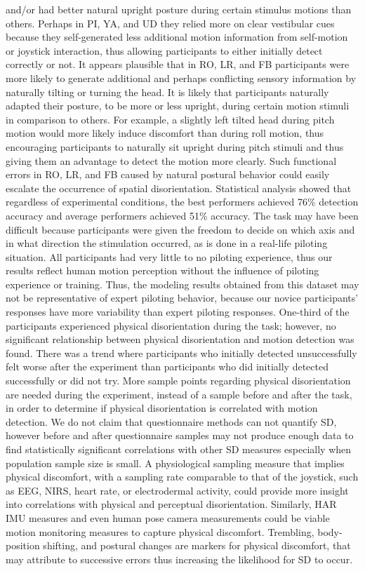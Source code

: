 \documentclass{ieeeaccess}
\begin{document}
and/or had better natural upright posture during certain stimulus motions than others. Perhaps in PI, YA, and UD they relied more on clear vestibular cues because they self-generated less additional motion information from self-motion or joystick interaction, thus allowing participants to either initially detect correctly or not. It appears plausible that in RO, LR, and FB participants were more likely to generate additional and perhaps conflicting sensory information by naturally tilting or turning the head. It is likely that participants naturally adapted their posture, to be more or less upright, during certain motion stimuli in comparison to others. For example, a slightly left tilted head during pitch motion would more likely induce discomfort than during roll motion, thus encouraging participants to naturally sit upright during pitch stimuli and thus giving them an advantage to detect the motion more clearly. Such functional errors in RO, LR, and FB caused by natural postural behavior could easily escalate the occurrence of spatial disorientation. Statistical analysis showed that regardless of experimental conditions, the best performers achieved 76\% detection accuracy and average performers achieved 51\% accuracy. The task may have been difficult because participants were given the freedom to decide on which axis and in what direction the stimulation occurred, as is done in a real-life piloting situation. All participants had very little to no piloting experience, thus our results reflect human motion perception without the influence of piloting experience or training. Thus, the modeling results obtained from this dataset may not be representative of expert piloting behavior, because our novice participants’ responses have more variability than expert piloting responses. One-third of the participants experienced physical disorientation during the task; however, no significant relationship between physical disorientation and motion detection was found. There was a trend where participants who initially detected unsuccessfully felt worse after the experiment than participants who did initially detected successfully or did not try. More sample points regarding physical disorientation are needed during the experiment, instead of a sample before and after the task, in order to determine if physical disorientation is correlated with motion detection. We do not claim that questionnaire methods can not quantify SD, however before and after questionnaire samples may not produce enough data to find statistically significant correlations with other SD measures especially when population sample size is small. A physiological sampling measure that implies physical discomfort, with a sampling rate comparable to that of the joystick, such as EEG, NIRS, heart rate, or electrodermal activity, could provide more insight into correlations with physical and perceptual disorientation. Similarly, HAR IMU measures and even human pose camera measurements could be viable motion monitoring measures to capture physical discomfort. Trembling, body-position shifting, and postural changes are markers for physical discomfort, that may attribute to successive errors thus increasing the likelihood for SD to occur.
\end{document}
